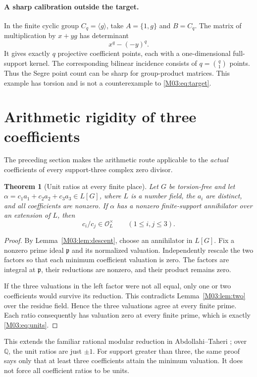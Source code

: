 \documentclass[11pt,a4paper,oneside]{report}
\newtheorem{theorem}{Theorem}[section]
\theoremstyle{definition}
\theoremstyle{remark}
\newcommand{\Q}{\mathbb Q}
\newcommand{\OO}{\mathcal O}
\begin{document}
\paragraph{A sharp calibration outside the target.}
In the finite cyclic group \(C_q=\langle g\rangle\), take \(A=\{1,g\}\) and \(B=C_q\). The matrix of multiplication by \(x+yg\) has determinant
\[
x^q-(-y)^q.
\]
It gives exactly \(q\) projective coefficient points, each with a one-dimensional full-support kernel. The corresponding bilinear incidence consists of \(q=\binom{q}{1}\) points. Thus the Segre point count can be sharp for group-product matrices. This example has torsion and is not a counterexample to \eqref{M03:eq:target}.

\section{Arithmetic rigidity of three coefficients}\label{M03:sec:arithmetic}
The preceding section makes the arithmetic route applicable to the \emph{actual} coefficients of every support-three complex zero divisor.

\begin{theorem}[Unit ratios at every finite place]\label{M03:thm:units}
Let \(G\) be torsion-free and let
\(\alpha=c_1a_1+c_2a_2+c_3a_3\in L[G]\), where \(L\) is a number field, the \(a_i\) are distinct, and all coefficients are nonzero. If \(\alpha\) has a nonzero finite-support annihilator over an extension of \(L\), then
\begin{equation}\label{M03:eq:units}
c_i/c_j\in\OO_L^\times\qquad(1\le i,j\le3).
\end{equation}
\end{theorem}
\begin{proof}
By Lemma~\ref{M03:lem:descent}, choose an annihilator in \(L[G]\). Fix a nonzero prime ideal \(\mathfrak p\) and its normalized valuation. Independently rescale the two factors so that each minimum coefficient valuation is zero. The factors are integral at \(\mathfrak p\), their reductions are nonzero, and their product remains zero.

If the three valuations in the left factor were not all equal, only one or two coefficients would survive its reduction. This contradicts Lemma~\ref{M03:lem:two} over the residue field. Hence the three valuations agree at every finite prime. Each ratio consequently has valuation zero at every finite prime, which is exactly \eqref{M03:eq:units}.
\end{proof}
This extends the familiar rational modular reduction in Abdollahi--Taheri \cite[Theorem 1.1 and its proof]{B:ATrational}; over \(\Q\), the unit ratios are just \(\pm1\). For support greater than three, the same proof says only that at least three coefficients attain the minimum valuation. It does not force all coefficient ratios to be units.
\end{document}
